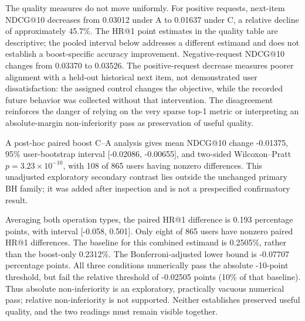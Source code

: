 \documentclass[conference]{IEEEtran}
\begin{document}
The quality measures do not move uniformly. For positive requests, next-item NDCG@10 decreases from 0.03012 under A to 0.01637 under C, a relative decline of approximately 45.7\%. The HR@1 point estimates in the quality table are descriptive; the pooled interval below addresses a different estimand and does not establish a boost-specific accuracy improvement. Negative-request NDCG@10 changes from 0.03370 to 0.03526. The positive-request decrease measures poorer alignment with a held-out historical next item, not demonstrated user dissatisfaction: the assigned control changes the objective, while the recorded future behavior was collected without that intervention. The disagreement reinforces the danger of relying on the very sparse top-1 metric or interpreting an absolute-margin non-inferiority pass as preservation of useful quality.

A post-hoc paired boost C--A analysis gives mean NDCG@10 change -0.01375, 95\% user-bootstrap interval [-0.02086, -0.00655], and two-sided Wilcoxon--Pratt $p=3.23\times10^{-10}$, with 108 of 865 users having nonzero differences. This unadjusted exploratory secondary contrast lies outside the unchanged primary BH family; it was added after inspection and is not a prespecified confirmatory result.

Averaging both operation types, the paired HR@1 difference is 0.193 percentage points, with interval [-0.058, 0.501]. Only eight of 865 users have nonzero paired HR@1 differences. The baseline for this combined estimand is 0.2505\%, rather than the boost-only 0.2312\%. The Bonferroni-adjusted lower bound is -0.07707 percentage points. All three conditions numerically pass the absolute -10-point threshold, but fail the relative threshold of -0.02505 points (10\% of that baseline). Thus absolute non-inferiority is an exploratory, practically vacuous numerical pass; relative non-inferiority is not supported. Neither establishes preserved useful quality, and the two readings must remain visible together.
\end{document}
